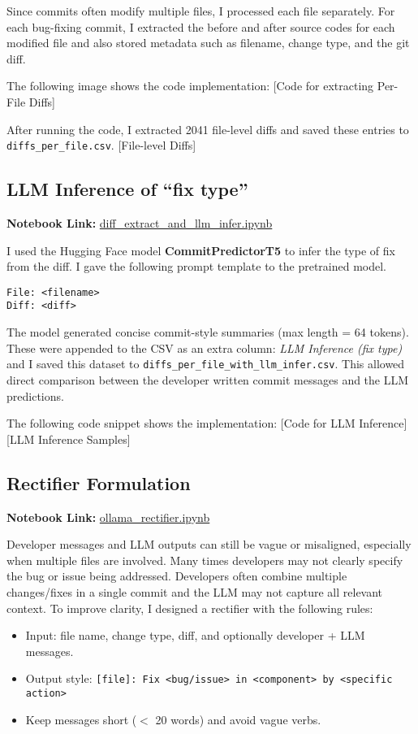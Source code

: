 \documentclass[10pt,a4paper]{report}
\begin{document}
Since commits often modify multiple files, I processed each file separately. For each bug-fixing commit, I extracted the before and after source codes for each modified file and also stored metadata such as filename, change type, and the git diff.

The following image shows the code implementation:
[Code for extracting Per-File Diffs]

After running the code, I extracted 2041 file-level diffs and saved these entries to \texttt{diffs\_per\_file.csv}.
[File-level Diffs]

\subsection{LLM Inference of ``fix type''}
\textbf{Notebook Link:} \href{https://github.com/ShardulJunagade/cs202-stt/blob/main/lab2/diff_extract_and_llm_infer.ipynb}{diff\_extract\_and\_llm\_infer.ipynb}

I used the Hugging Face model \textbf{CommitPredictorT5} to infer the type of fix from the diff. I gave the following prompt template to the pretrained model.
\begin{verbatim}
File: <filename>
Diff: <diff>
\end{verbatim}
The model generated concise commit-style summaries (max length = 64 tokens). These were appended to the CSV as an extra column: \textit{LLM Inference (fix type)} and I saved this dataset to \texttt{diffs\_per\_file\_with\_llm\_infer.csv}. This allowed direct comparison between the developer written commit messages and the LLM predictions.

The following code snippet shows the implementation:
[Code for LLM Inference]
[LLM Inference Samples]

\subsection{Rectifier Formulation}
\textbf{Notebook Link:} \href{https://github.com/ShardulJunagade/cs202-stt/blob/main/lab2/ollama_rectifier.ipynb}{ollama\_rectifier.ipynb}

Developer messages and LLM outputs can still be vague or misaligned, especially when multiple files are involved. Many times developers may not clearly specify the bug or issue being addressed. Developers often combine multiple changes/fixes in a single commit and the LLM may not capture all relevant context. To improve clarity, I designed a rectifier with the following rules:
\begin{itemize}[itemsep=0.05em, topsep=0pt]
    \item Input: file name, change type, diff, and optionally developer + LLM messages.
    \item Output style: \texttt{[file]: Fix <bug/issue> in <component> by <specific action>}
    \item Keep messages short ($<$ 20 words) and avoid vague verbs.
\end{itemize}
\end{document}
